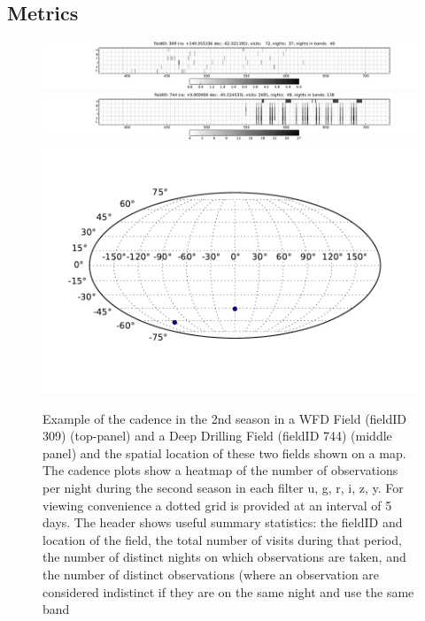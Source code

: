 
\subsection{Metrics}
\label{sec:\secname:metrics}


\begin{figure}
 \centering
 \includegraphics[width=\textwidth]{figs/supernova/fig_309_2ndYear}
 \includegraphics[width=\textwidth]{figs/supernova/fig_744_2ndYear}
 \includegraphics[height=0.2\textheight]{figs/supernova/loc_309_744.pdf}
 \label{fig:SN_sampling}
 \caption{Example of the cadence in the 2nd season in a WFD Field
 (fieldID 309) (top-panel) and a Deep Drilling Field (fieldID 744)
 (middle panel) and the spatial location of these two fields shown on a
 map. The cadence plots show a heatmap of the number of observations per
 night during the second season in each filter u, g, r, i, z, y. For
 viewing convenience a dotted grid is provided at an interval of 5 days.
 The header shows useful summary statistics: the fieldID and location of
 the field, the total number of visits during that period, the number of
 distinct nights on which observations are taken, and the number of
 distinct observations (where an observation are considered indistinct
 if they are on the same night and use the same band}
\end{figure}

